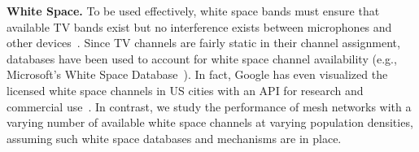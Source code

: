{\bf White Space.} To be used effectively, white space bands must ensure that available TV bands
exist but no interference exists between microphones and other devices~\cite{bahl2009white}. 
Since TV channels are fairly static in their channel assignment, databases have been used to 
account for white space channel availability (e.g., Microsoft's White Space Database~\cite{msdatabase}).
In fact, Google has even visualized the licensed white space channels in US cities with an API for 
research and commercial use~\cite{googledatabase}.  In contrast, we study the performance of mesh 
networks with a varying number of available white space channels at varying population densities, assuming such white space databases and mechanisms are in place.






